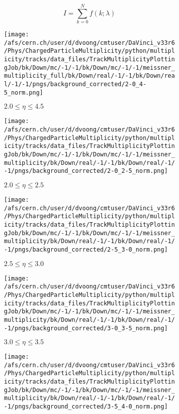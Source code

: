 \begin{equation}
	I = \sum^{N}_{k=0} f(k; \lambda)
\end{equation}

\begin{figure}[h]
	\centering
	\begin{subfigure}{0.32\textwidth}
		\texttt{[image: /afs/cern.ch/user/d/dvoong/cmtuser/DaVinci\_v33r6/Phys/ChargedParticleMultiplicity/python/multiplicity/tracks/data\_files/TrackMultiplicityPlottingJob/bk/Down/mc/-1/-1/bk/Down/mc/-1/-1/meissner\_multiplicity\_full/bk/Down/real/-1/-1/bk/Down/real/-1/-1/pngs/background\_corrected/2-0\_4-5\_norm.png]}
		\caption{$2.0 \le \eta \le 4.5$}
	\end{subfigure}
	\begin{subfigure}{0.32\textwidth}
		\texttt{[image: /afs/cern.ch/user/d/dvoong/cmtuser/DaVinci\_v33r6/Phys/ChargedParticleMultiplicity/python/multiplicity/tracks/data\_files/TrackMultiplicityPlottingJob/bk/Down/mc/-1/-1/bk/Down/mc/-1/-1/meissner\_multiplicity/bk/Down/real/-1/-1/bk/Down/real/-1/-1/pngs/background\_corrected/2-0\_2-5\_norm.png]}
		\caption{$2.0 \le \eta \le 2.5$}
	\end{subfigure}
	\begin{subfigure}{0.32\textwidth}
		\texttt{[image: /afs/cern.ch/user/d/dvoong/cmtuser/DaVinci\_v33r6/Phys/ChargedParticleMultiplicity/python/multiplicity/tracks/data\_files/TrackMultiplicityPlottingJob/bk/Down/mc/-1/-1/bk/Down/mc/-1/-1/meissner\_multiplicity/bk/Down/real/-1/-1/bk/Down/real/-1/-1/pngs/background\_corrected/2-5\_3-0\_norm.png]}
		\caption{$2.5 \le \eta \le 3.0$}
	\end{subfigure}
	\begin{subfigure}{0.32\textwidth}
		\texttt{[image: /afs/cern.ch/user/d/dvoong/cmtuser/DaVinci\_v33r6/Phys/ChargedParticleMultiplicity/python/multiplicity/tracks/data\_files/TrackMultiplicityPlottingJob/bk/Down/mc/-1/-1/bk/Down/mc/-1/-1/meissner\_multiplicity/bk/Down/real/-1/-1/bk/Down/real/-1/-1/pngs/background\_corrected/3-0\_3-5\_norm.png]}
		\caption{$3.0 \le \eta \le 3.5$}
	\end{subfigure}
	\begin{subfigure}{0.32\textwidth}
		\texttt{[image: /afs/cern.ch/user/d/dvoong/cmtuser/DaVinci\_v33r6/Phys/ChargedParticleMultiplicity/python/multiplicity/tracks/data\_files/TrackMultiplicityPlottingJob/bk/Down/mc/-1/-1/bk/Down/mc/-1/-1/meissner\_multiplicity/bk/Down/real/-1/-1/bk/Down/real/-1/-1/pngs/background\_corrected/3-5\_4-0\_norm.png]}

\end{subfigure}
\end{figure}
